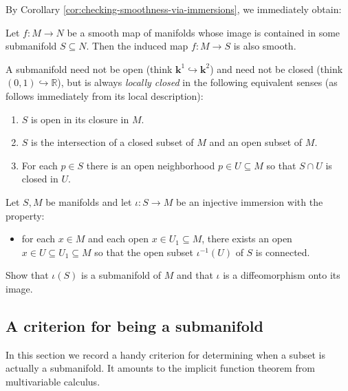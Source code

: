 \documentclass[reqno]{amsart} 
\begin{document}
By Corollary \ref{cor:checking-smoothness-via-immersions},
we immediately obtain:
\begin{proposition}\label{prop:smoothness-preserved-codomain-pass-to-submfld}
  Let $f : M \rightarrow N$ be a smooth map of manifolds
  whose image is contained
  in some submanifold $S \subseteq N$.
  Then the induced map $f : M \rightarrow S$
  is also smooth.
\end{proposition}

\begin{remark}\label{rmk:submfld-locally-closed}
  A submanifold need not be open (think $\mathbf{k}^1
  \hookrightarrow \mathbf{k}^2$)
  and need not be closed
  (think $(0,1) \hookrightarrow \mathbb{R}$),
  but is always \emph{locally closed}
  in the following equivalent senses (as follows immediately
  from its local description):
  \begin{enumerate}
  \item $S$ is open in its closure in $M$.
  \item $S$ is the intersection of a closed subset of $M$ and an
    open subset of $M$.
  \item For each $p \in S$ there is an open neighborhood $p \in
    U \subseteq M$
    so that $S \cap U$ is closed in $U$.
  \end{enumerate}
\end{remark}

\begin{exercise}
  Let $S,M$ be manifolds and let $\iota : S \rightarrow M$ be an
  injective immersion with the property:
  \begin{itemize}
  \item for each $x \in M$ and each open
    $x \in U_1 \subseteq M$, there exists an open
    $x \in U \subseteq U_1 \subseteq M$
    so that the open subset $\iota^{-1}(U)$ of $S$
    is connected.
  \end{itemize}
  Show that $\iota(S)$ is a submanifold of $M$ and that $\iota$ is a diffeomorphism onto its image.
\end{exercise}

\subsection{A criterion for being a submanifold}
\label{sec:org6e7a46d}
In this section we record a handy criterion for determining when
a subset is actually a submanifold.
It amounts to the implicit function theorem from multivariable calculus.
\end{document}
